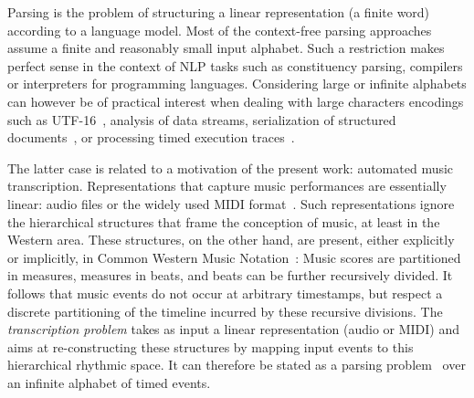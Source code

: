%
%
Parsing is the problem
of structuring a linear representation
(a finite word) according to a language model. %
%
Most of the context-free parsing approaches~\cite{GruneJacobs08parsing}
assume a finite and reasonably small input alphabet. %
Such a restriction makes perfect sense in the context of
NLP tasks such as constituency parsing, 
compilers or interpreters for programming languages.
Considering large or infinite alphabets can however be of
practical interest when dealing with large characters encodings such as UTF-16~\cite{dAntoni21CACM},
%
analysis of data streams, serialization of structured documents~\cite{Segoufin06csl,NevenSchwentickVianu04FSMinfinite},
or processing timed execution traces~\cite{Bouyer03algebraic}.
%

The latter case is related to a motivation  of  the present work:
automated music transcription. Representations that capture  music performances
are essentially linear:
audio files or the widely used
MIDI format~\cite{Selfridge-Field97beyondMIDI}. %
Such representations ignore the hierarchical structures that frame the
conception of music, at least in the Western area. These structures, on the other hand,
are present, either explicitly  or implicitly,
in Common Western Music Notation~\cite{Gould11Notation}:
Music scores are partitioned in measures,
measures in beats, and beats can be further recursively divided.
It follows that music events do not occur at arbitrary timestamps,
but respect a discrete partitioning of the  timeline incurred by
these recursive divisions.
The \emph{transcription problem} takes
as input a linear representation (audio or MIDI) and aims at re-constructing
these structures
by mapping input events to this hierarchical rhythmic space.
It can therefore be stated as a parsing problem~\cite{foscarin:hal-01988990}
over an infinite alphabet of timed events.

